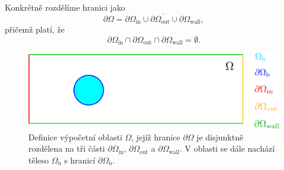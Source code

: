Konkrétně rozdělíme hranici jako
\begin{equation}\label{eq:border decomposition}
\partial \Omega = \overline{\partial \Omega_{\mathrm{in}} \cup \partial \Omega_{\mathrm{out}} \cup \partial \Omega_{\mathrm{wall}}},
\end{equation}
přičemž platí, že
\begin{equation}
\partial \Omega_{\mathrm{in}} \cap \partial \Omega_{\mathrm{out}} \cap \partial \Omega_{\mathrm{wall}} = \emptyset.
\end{equation}
\begin{figure}[h]
	\centering
	\vspace{-3.8mm}
	\includegraphics[width=1.0\textwidth]{Images/vypocetni-oblast.pdf}
	\vspace{-3.8mm}
	\caption{Definice výpočetní oblasti $ \Omega $, jejíž hranice $ \partial \Omega $ je disjunktně rozdělena na tři části $ \partial \Omega _{\mathrm{in}} $, $ \partial \Omega _{\mathrm{out}} $ a $ \partial \Omega _{\mathrm{wall}} $. V oblasti se dále nachází těleso $ \Omega _{\mathrm{b}} $ s hranicí $ \partial \Omega _{\mathrm{b}} $.}
	\label{fig:vypocetni-oblast}
\end{figure}


